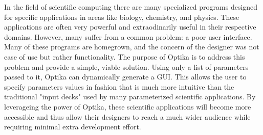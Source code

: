 In the field of scientific computing there are many specialized programs designed for specific applications 
in areas like biology, chemistry, and physics. These applications are often very powerful and extraodinarily 
useful in their respective domains. However, many suffer from a common problem: a poor user interface. Many 
of these programs are homegrown, and the concern of the designer was not ease of use but rather 
functionality. The purpose of Optika is to address this problem and provide a simple, viable solution. Using
only a list of parameters passed to it, Optika can dynamically generate a GUI. This allows the user to specify 
parameters values in fashion that is much more intuitive than the traditional "input decks" used by many 
parameterized scientific applications. By leverageing the power of Optika, these scientific applications 
will become more accessible and thus allow their designers to reach a much wider audience while requiring 
minimal extra development effort.
